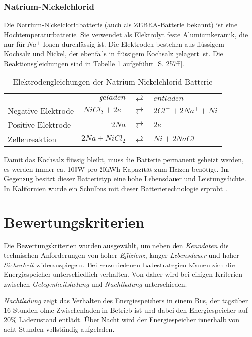 \subsubsection{Natrium-Nickelchlorid}
Die Natrium-Nickelcloridbatterie (auch als ZEBRA-Batterie bekannt) ist eine Hochtemperaturbatterie. Sie verwendet als Elektrolyt feste Alumiumkeramik, die nur für $Na^+$-Ionen durchlässig ist. Die Elektroden bestehen aus flüssigem Kochsalz und Nickel, der ebenfalls in flüssigem Kochsalz gelagert ist. Die Reaktionsgleichungen sind in Tabelle \ref{ZEBRA} aufgeführt \cite{KiehneBattery}[S. 257ff].

\begin{table}\centering
	\begin{tabularx}{\linewidth}{XrcX}
		&       $geladen$ & $\rightleftarrows$ & $entladen$           \\
		Negative Elektrode & $NiCl_2 + 2e^-$ & $\rightleftarrows$ & $2Cl^- + 2Na^+ + Ni$ \\
		Positive Elektrode &           $2Na$ & $\rightleftarrows$ & $2e^-$               \\ \midrule
		Zellenreaktion     &  $2Na + NiCl_2$ & $\rightleftarrows$ & $Ni + 2NaCl$
	\end{tabularx}
	\caption{Elektrodengleichungen der Natrium-Nickelchlorid-Batterie}
	\label{ZEBRA}
\end{table}

Damit das Kochsalz flüssig bleibt, muss die Batterie permanent geheizt werden, es werden immer ca. 100W pro 20kWh Kapazität zum Heizen benötigt. Im Gegenzug besitzt dieser Batterietyp eine hohe Lebensdauer und Leistungsdichte. In Kalifornien wurde ein Schulbus mit dieser Batterietechnologie erprobt \cite{Electric-Transportation-Department:2004}.

\section{Bewertungskriterien}
Die Bewertungskriterien wurden ausgewählt, um neben den \emph{Kenndaten} die technischen Anforderungen von hoher \emph{Effizienz}, langer \emph{Lebensdauer} und hoher \emph{Sicherheit} widerzuspiegeln. Bei verschiedenen Ladestrategien können sich die Energiespeicher unterschiedlich verhalten. Von daher wird bei einigen Kriterien zwischen \emph{Gelegenheitsladung} und \emph{Nachtladung} unterschieden.

\emph{Nachtladung} zeigt das Verhalten des Energiespeichers in einem Bus, der tagsüber 16 Stunden ohne Zwischenladen in Betrieb ist und dabei den Energiespeicher auf 20\% Ladezustand entlädt. Über Nacht wird der Energiespeicher innerhalb von acht Stunden vollständig aufgeladen.

